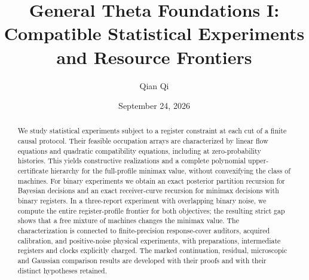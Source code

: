 
\usepackage{tikz}
\usetikzlibrary{arrows.meta,positioning}
\newcommand{\Wone}{W_1}
\newcommand{\Del}{\Delta}
\newcommand{\emptyw}{\varnothing}
\newcommand{\osc}{\operatorname{osc}}
\newcommand{\diam}{\operatorname{diam}}
\newcommand{\Lipone}{\operatorname{Lip}_1}
\newcommand{\aff}{\operatorname{aff}}
\newcommand{\conv}{\operatorname{conv}}
\newcommand{\rplus}{\operatorname{rank}_{+}}
\newcommand{\dpr}{\delta^{\rm p}}
\newcommand{\dhi}{\delta^{\rm h}}
\newcommand{\dvi}{\delta^{\rm v}}
\newcommand{\dmix}{\delta^{\rm mix}}
\newcommand{\cK}{\mathcal K}
\newcommand{\cB}{\mathcal B}
\newcommand{\cI}{\mathcal I}
\newcommand{\KL}{\operatorname{KL}}
\newcommand{\vaudit}{v^{\rm aud}}
\title[Compatible statistical experiments]{General Theta Foundations I:\\
Compatible Statistical Experiments and Resource Frontiers}
\author{Qian Qi}
\date{September 24, 2026}

\begin{abstract}
We study statistical experiments subject to a register constraint at
each cut of a finite causal protocol. Their feasible occupation arrays
are characterized by linear flow equations and quadratic compatibility
equations, including at zero-probability histories. This yields
constructive realizations and a complete polynomial upper-certificate
hierarchy for the full-profile minimax value, without convexifying the
class of machines. For binary experiments we obtain an exact posterior
partition recursion for Bayesian decisions and an exact receiver-curve
recursion for minimax decisions with binary registers. In a three-report
experiment with overlapping binary noise, we compute the entire
register-profile frontier for both objectives; the resulting strict
gap shows that a free mixture of machines changes the minimax value.
The characterization is connected to finite-precision response-cover
auditors, acquired calibration, and positive-noise physical experiments,
with preparations, intermediate registers and clocks explicitly charged.
The marked continuation, residual, microscopic and Gaussian comparison
results are developed with their proofs and with their distinct
hypotheses retained.
\end{abstract}
\maketitle
\tableofcontents

